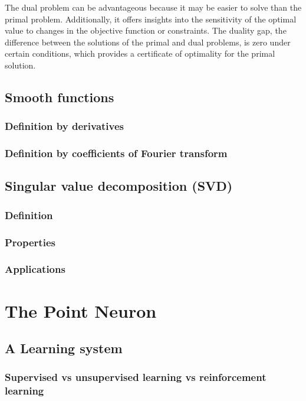 \documentclass[11pt]{book} %
\begin{document}
The dual problem can be advantageous because it may be easier to solve than the primal problem. Additionally, it offers insights into the sensitivity of the optimal value to changes in the objective function or constraints. The duality gap, the difference between the solutions of the primal and dual problems, is zero under certain conditions, which provides a certificate of optimality for the primal solution.

%
%
%

\section{Smooth functions}
\subsection{Definition by derivatives}
\subsection{Definition by coefficients of Fourier transform}

\section{Singular value decomposition (SVD)}
\subsection{Definition}
\subsection{Properties}
\subsection{Applications}

%
%
%
%
%
%
%
%
%
%
%
%
%
%
%
%

\chapter{The Point Neuron}

\section{A Learning system}
\subsection{Supervised vs unsupervised learning vs reinforcement learning}
\end{document}
